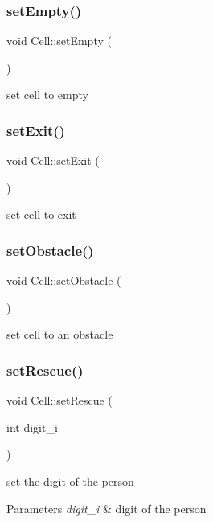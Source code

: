 \subsubsection{\texorpdfstring{set\+Empty()}{setEmpty()}}
{\footnotesize\ttfamily void Cell\+::set\+Empty (\begin{DoxyParamCaption}{ }\end{DoxyParamCaption})}

set cell to empty \mbox{\label{class_cell_a9fa0a3c17d798320c78bffe44411008e}} 
\subsubsection{\texorpdfstring{set\+Exit()}{setExit()}}
{\footnotesize\ttfamily void Cell\+::set\+Exit (\begin{DoxyParamCaption}{ }\end{DoxyParamCaption})}

set cell to exit \mbox{\label{class_cell_a34e953e7f720c3382f0b13c2480cafd0}} 
\subsubsection{\texorpdfstring{set\+Obstacle()}{setObstacle()}}
{\footnotesize\ttfamily void Cell\+::set\+Obstacle (\begin{DoxyParamCaption}{ }\end{DoxyParamCaption})}

set cell to an obstacle \mbox{\label{class_cell_afa194cda3c1e8f9be100c9a14fda7f9d}} 
\subsubsection{\texorpdfstring{set\+Rescue()}{setRescue()}}
{\footnotesize\ttfamily void Cell\+::set\+Rescue (\begin{DoxyParamCaption}\item[{int}]{digit\+\_\+i }\end{DoxyParamCaption})}

set the digit of the person 
\begin{DoxyParams}{Parameters}
{\em digit\+\_\+i} & digit of the person \\
\hline
\end{DoxyParams}
\mbox{\label{class_cell_a9e2d13652a170ef25265a41dfe39e93f}} 
